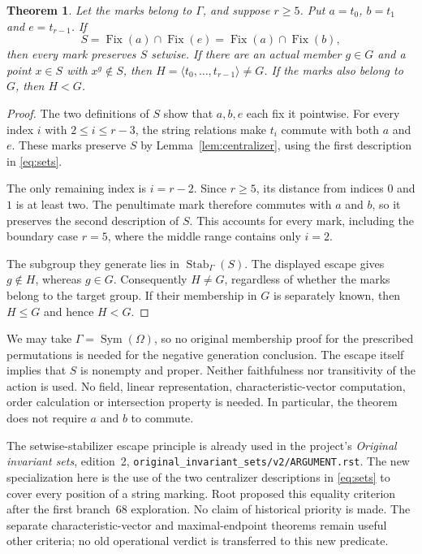 \documentclass[11pt]{article}
\newtheorem{theorem}{Theorem}
\newcommand{\Fix}{\operatorname{Fix}}
\newcommand{\Stab}{\operatorname{Stab}}
\begin{document}
\begin{theorem}\label{thm:gluing}
Let the marks belong to $\Gamma$, and suppose $r\geq5$.
Put $a=t_0$, $b=t_1$ and $e=t_{r-1}$.
If
\begin{equation}\label{eq:sets}
 S=\Fix(a)\cap\Fix(e)=\Fix(a)\cap\Fix(b),
\end{equation}
then every mark preserves $S$ setwise. If there are an actual member
$g\in G$ and a point $x\in S$ with $x^g\notin S$, then
$H=\langle t_0,\ldots,t_{r-1}\rangle\ne G$. If the marks also
belong to $G$, then $H<G$.
\end{theorem}
\begin{proof}
The two definitions of $S$ show that $a,b,e$ each fix it pointwise.
For every index $i$ with $2\leq i\leq r-3$, the string relations
make $t_i$ commute with both $a$ and $e$. These marks preserve $S$
by Lemma~\ref{lem:centralizer}, using the first description in
\eqref{eq:sets}.

The only remaining index is $i=r-2$. Since $r\geq5$, its distance
from indices $0$ and $1$ is at least two. The penultimate mark
therefore commutes with $a$ and $b$, so it preserves the second
description of $S$. This accounts for every mark, including the
boundary case $r=5$, where the middle range contains only $i=2$.

The subgroup they generate lies in $\Stab_\Gamma(S)$. The displayed
escape gives $g\notin H$, whereas $g\in G$. Consequently $H\ne G$,
regardless of whether the marks belong to the target group. If their
membership in $G$ is separately known, then $H\leq G$ and hence
$H<G$.
\end{proof}

We may take $\Gamma=\operatorname{Sym}(\Omega)$, so no original
membership proof for the prescribed permutations is needed for the
negative generation conclusion. The escape itself implies that
$S$ is nonempty and proper. Neither
faithfulness nor transitivity of the action is used. No field,
linear representation, characteristic-vector computation, order
calculation or intersection property is needed. In particular,
the theorem does not require $a$ and $b$ to commute.

The setwise-stabilizer escape principle is already used in the
project's \emph{Original invariant sets}, edition~2,
\texttt{original\_invariant\_sets/v2/ARGUMENT.rst}. The new
specialization here is the use of the two centralizer descriptions
in \eqref{eq:sets} to cover every position of a string marking.
Root proposed this equality criterion after the first branch~68
exploration. No claim of historical priority is made. The separate
characteristic-vector and maximal-endpoint theorems remain useful
other criteria; no old operational verdict is transferred to this
new predicate.
\end{document}
